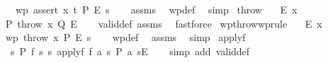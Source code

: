 \begin{isabellebody}
\ \ \ \ \ {\isachardoublequoteopen}wp\ {\isacharparenleft}{\kern0pt}assert\ x\ t{\isacharparenright}{\kern0pt}\ P\ E\ s{\isachardoublequoteclose}\isanewline
%
\isadelimproof
\ \ %
\endisadelimproof
%
\isatagproof
{}\isamarkupfalse%
\ assms\ \isamarkupfalse%
\ wp{\isacharunderscore}{\kern0pt}def\ \isamarkupfalse%
\ simp%
\endisatagproof
{\isafoldproof}%
%
\isadelimproof
\isanewline
%
\endisadelimproof
\isanewline
{}\isamarkupfalse%
\ throw{\isacharcolon}{\kern0pt}\isanewline
\ \ \ {\isachardoublequoteopen}E\ x{\isachardoublequoteclose}\isanewline
\ \ \ {\isachardoublequoteopen}{\isasymlbrace}P{\isasymrbrace}\ throw\ x\ {\isasymlbrace}Q{\isasymrbrace}{\isacharcomma}{\kern0pt}\ {\isasymlbrace}E{\isasymrbrace}{\isachardoublequoteclose}\isanewline
%
\isadelimproof
\ \ %
\endisadelimproof
%
\isatagproof
{}\isamarkupfalse%
\ valid{\isacharunderscore}{\kern0pt}def\ assms\ \isamarkupfalse%
\ fastforce%
\endisatagproof
{\isafoldproof}%
%
\isadelimproof
\isanewline
%
\endisadelimproof
\isanewline
{}\isamarkupfalse%
\ wpthrow{\isacharbrackleft}{\kern0pt}wprule{\isacharbrackright}{\kern0pt}{\isacharcolon}{\kern0pt}\isanewline
\ \ \ {\isachardoublequoteopen}E\ x{\isachardoublequoteclose}\isanewline
\ \ \ {\isachardoublequoteopen}wp\ {\isacharparenleft}{\kern0pt}throw\ x{\isacharparenright}{\kern0pt}\ P\ E\ s{\isachardoublequoteclose}\isanewline
%
\isadelimproof
\ \ %
\endisadelimproof
%
\isatagproof
{}\isamarkupfalse%
\ wp{\isacharunderscore}{\kern0pt}def\ \isamarkupfalse%
\ assms\ \isamarkupfalse%
\ simp%
\endisatagproof
{\isafoldproof}%
%
\isadelimproof
\isanewline
%
\endisadelimproof
\isanewline
{}\isamarkupfalse%
\ applyf{\isacharcolon}{\kern0pt}\isanewline
\ \ \ \ {\isachardoublequoteopen}{\isasymlbrace}{\isasymlambda}s{\isachardot}{\kern0pt}\ P\ {\isacharparenleft}{\kern0pt}f\ s{\isacharparenright}{\kern0pt}\ s{\isasymrbrace}\ applyf\ f\ {\isasymlbrace}{\isasymlambda}a\ s{\isachardot}{\kern0pt}\ P\ a\ s{\isasymrbrace}{\isacharcomma}{\kern0pt}{\isasymlbrace}E{\isasymrbrace}{\isachardoublequoteclose}\isanewline
%
\isadelimproof
\ \ %
\endisadelimproof
%
\isatagproof
{}\isamarkupfalse%
\ {\isacharparenleft}{\kern0pt}simp\ add{\isacharcolon}{\kern0pt}\ valid{\isacharunderscore}{\kern0pt}def{\isacharparenright}{\kern0pt}%
\endisatagproof
{\isafoldproof}%
%
\isadelimproof
\isanewline

\end{isabellebody}
